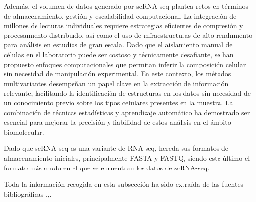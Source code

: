 Además, el volumen de datos generado por scRNA-seq plantea retos en términos de almacenamiento, gestión y escalabilidad computacional. La integración de 
millones de lecturas individuales requiere estrategias eficientes de compresión y procesamiento distribuido, así como el uso de infraestructuras de alto 
rendimiento para análisis en estudios de gran escala. Dado que el aislamiento manual de células en el laboratorio puede ser costoso y técnicamente desafiante, 
se han propuesto enfoques computacionales que permitan inferir la composición celular sin necesidad de manipulación experimental. En este contexto, 
los métodos multivariantes desempeñan un papel clave en la extracción de información relevante, facilitando la identificación de estructuras en los datos 
sin necesidad de un conocimiento previo sobre los tipos celulares presentes en la muestra. La combinación de técnicas estadísticas y aprendizaje automático 
ha demostrado ser esencial para mejorar la precisión y fiabilidad de estos análisis en el ámbito biomolecular. \newline


Dado que scRNA-seq es una variante de RNA-seq, hereda sus formatos de almacenamiento iniciales, principalmente FASTA y FASTQ, siendo este último el formato 
más crudo en el que se encuentran los datos de scRNA-seq. %

Toda la información recogida en esta subsección ha sido extraída de las fuentes bibliográficas \cite{transcriptomics-3-scRNA-seq-1},\cite{transcriptomics-3-scRNA-seq-2},\cite{BroadInstitute2019}.